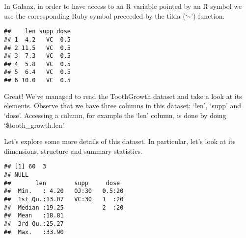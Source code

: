 \documentclass[]{article}
\newenvironment{Shaded}{\begin{snugshade}}{\end{snugshade}}
\newcommand{\DataTypeTok}[1]{\textcolor[rgb]{0.13,0.29,0.53}{#1}}
\newcommand{\StringTok}[1]{\textcolor[rgb]{0.31,0.60,0.02}{#1}}
\newcommand{\CommentTok}[1]{\textcolor[rgb]{0.56,0.35,0.01}{\textit{#1}}}
\newcommand{\NormalTok}[1]{#1}
\begin{document}
In Galaaz, in order to have access to an R variable pointed by an R
symbol we use the corresponding Ruby symbol preceeded by the tilda
(`\textasciitilde{}') function.

\begin{Shaded}
\end{Shaded}

\begin{verbatim}
##    len supp dose
## 1  4.2   VC  0.5
## 2 11.5   VC  0.5
## 3  7.3   VC  0.5
## 4  5.8   VC  0.5
## 5  6.4   VC  0.5
## 6 10.0   VC  0.5
\end{verbatim}

Great! We've managed to read the ToothGrowth dataset and take a look at
its elements. Observe that we have three columns in this dataset: `len',
`supp' and `dose'. Accessing a column, for example the `len' column, is
done by doing `\$tooth\_growth.len'.

Let's explore some more details of this dataset. In particular, let's
look at its dimensions, structure and summary statistics.

\begin{Shaded}
\end{Shaded}

\begin{verbatim}
## [1] 60  3
## NULL
##       len        supp     dose   
##  Min.   : 4.20   OJ:30   0.5:20  
##  1st Qu.:13.07   VC:30   1  :20  
##  Median :19.25           2  :20  
##  Mean   :18.81                   
##  3rd Qu.:25.27                   
##  Max.   :33.90
\end{verbatim}
\end{document}
